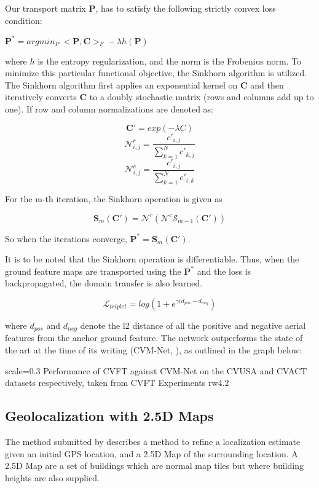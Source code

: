 Our transport matrix $\mathbf{P}$, has to satisfy the following strictly convex loss condition:

$\mathbf{P}^* = argmin_{P} \ <\mathbf{P}, \mathbf{C}>_F - \lambda h(\mathbf{P})
$

where $h$ is the entropy regularization, and the norm is the Frobenius norm. To minimize this particular functional objective, the Sinkhorn algorithm is utilized. The Sinkhorn algorithm first applies an exponential kernel on $\mathbf{C}$ and then iteratively converts $\mathbf{C}$ to a doubly stochastic matrix (rows and columns add up to one). If row and column normalizations are denoted as:

\[\mathbf{C}' = exp(-\lambda C)\]
\[\mathcal{N}^r_{i, j} = \frac{c'_{i,j}}{\sum_{k=1}^{N} c'_{k,j}} \]
\[\mathcal{N}^c_{i, j} = \frac{c'_{i,j}}{\sum_{k=1}^{N}c'_{i,k}} \]

For the m-th iteration, the Sinkhorn operation is given as 

\[\mathbf{S}_m(\mathbf{C}') = \mathcal{N}^r(\mathcal{N}^c \mathcal{S}_{m-1}(\mathbf{C}'))\]

So when the iterations converge, $\mathbf{P}^* = \mathbf{S}_m(\mathbf{C}')$.

It is to be noted that the Sinkhorn operation is differentiable. Thus, when the ground feature maps are transported using the $\mathbf{P}^*$ and the loss is backpropagated, the domain transfer is also learned.

\[\mathcal{L}_{triplet} = log(1 + e^{\gamma (d_{pos} - d_{neg}})\]

where $d_{pos}$ and $d_{neg}$ denote the l2 distance of all the positive and negative aerial features from the anchor ground feature. The network outperforms the state of the art at the time of its writing (CVM-Net, \cite{Hu2018}), as outlined in the graph below:


{scale=0.3}%
{Performance of CVFT against CVM-Net on the CVUSA and CVACT datasets respectively, taken from \cite{Shi2019}}%
{CVFT Experiments}%
{rw4.2} %

\newpage
\subsection{Geolocalization with 2.5D Maps}
The method submitted by \cite{armagan2017} describes a method to refine a localization estimate given an initial GPS location, and a 2.5D Map of the surrounding location. A 2.5D Map are a set of buildings which are normal map tiles but where building heights are also supplied. 


